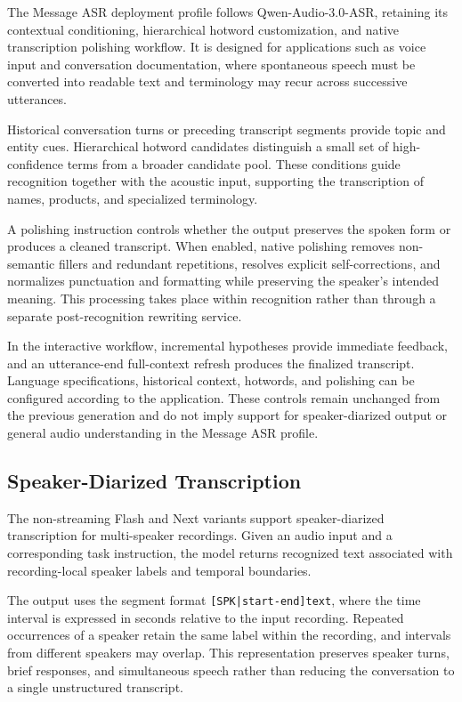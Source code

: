 \documentclass{article}
\begin{document}
The Message ASR deployment profile follows Qwen-Audio-3.0-ASR, retaining its contextual conditioning, hierarchical hotword customization, and native transcription polishing workflow. It is designed for applications such as voice input and conversation documentation, where spontaneous speech must be converted into readable text and terminology may recur across successive utterances.

Historical conversation turns or preceding transcript segments provide topic and entity cues. Hierarchical hotword candidates distinguish a small set of high-confidence terms from a broader candidate pool. These conditions guide recognition together with the acoustic input, supporting the transcription of names, products, and specialized terminology.

A polishing instruction controls whether the output preserves the spoken form or produces a cleaned transcript. When enabled, native polishing removes non-semantic fillers and redundant repetitions, resolves explicit self-corrections, and normalizes punctuation and formatting while preserving the speaker's intended meaning. This processing takes place within recognition rather than through a separate post-recognition rewriting service.

In the interactive workflow, incremental hypotheses provide immediate feedback, and an utterance-end full-context refresh produces the finalized transcript. Language specifications, historical context, hotwords, and polishing can be configured according to the application. These controls remain unchanged from the previous generation and do not imply support for speaker-diarized output or general audio understanding in the Message ASR profile.

\subsection{Speaker-Diarized Transcription}
\label{subsec:deployment-speaker-asr}

The non-streaming Flash and Next variants support speaker-diarized transcription for multi-speaker recordings. Given an audio input and a corresponding task instruction, the model returns recognized text associated with recording-local speaker labels and temporal boundaries.

The output uses the segment format \texttt{[SPK|start-end]text}, where the time interval is expressed in seconds relative to the input recording. Repeated occurrences of a speaker retain the same label within the recording, and intervals from different speakers may overlap. This representation preserves speaker turns, brief responses, and simultaneous speech rather than reducing the conversation to a single unstructured transcript.
\end{document}
